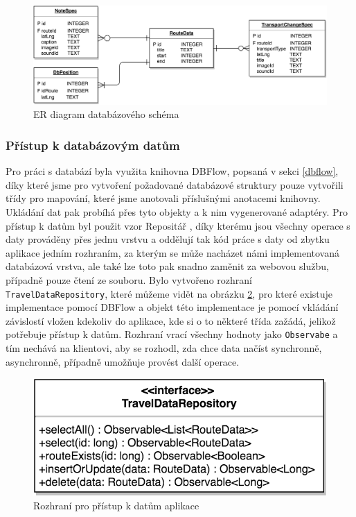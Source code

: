 \documentclass[czech,master,public,dept460,male,java,cpdeclaration]{diploma}
\begin{document}
\begin{figure}[H]
        \centering
                \includegraphics[scale=0.2]{img/db_er.png}
        \caption{ER diagram databázového schéma}
        \label{fig:db_er}
\end{figure}

\subsubsection{Přístup k databázovým datům}
Pro práci s databází byla využita knihovna DBFlow, popsaná v sekci \ref{dbflow}, díky které jsme pro vytvoření
požadované databázové struktury pouze vytvořili třídy pro mapování, které jsme anotovali příslušnými
anotacemi knihovny. Ukládání dat pak probíhá přes tyto objekty a k nim vygenerované adaptéry.
Pro přístup k datům byl použit vzor Repositář \cite{repository}, díky kterému
jsou všechny operace s daty prováděny přes jednu vrstvu a oddělují tak kód práce s daty od zbytku aplikace
jedním rozhraním, za kterým se může nacházet námi implementovaná databázová vrstva, ale také lze toto
pak snadno zaměnit za webovou službu, případně pouze čtení ze souboru.
Bylo vytvořeno rozhraní \texttt{TravelDataRepository}, které můžeme vidět na obrázku \ref{fig:traveldatarepo},
pro které existuje implementace pomocí DBFlow a objekt této implementace je pomocí vkládání závislostí vložen
kdekoliv do aplikace, kde si o to některé třída zažádá, jelikož potřebuje přístup k datům.
Rozhraní vrací všechny hodnoty jako \texttt{Observabe} a tím nechává na klientovi, aby se rozhodl, zda
chce data načíst synchronně, asynchronně, případně umožňuje provést další operace.

\begin{figure}[H]
        \centering
                \includegraphics[scale=0.2]{img/repo.png}
        \caption{Rozhraní pro přístup k datům aplikace}
        \label{fig:traveldatarepo}
\end{figure}
\end{document}
